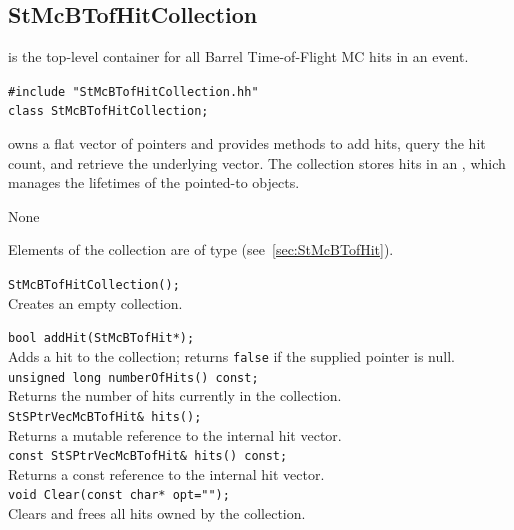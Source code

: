 \subsection{StMcBTofHitCollection}
 
\label{sec:StMcBTofHitCollection}
\begin{Entry}
\item[Summary]
     is the top-level container for all
    Barrel Time-of-Flight MC hits in an event.

\item[Synopsis]
    \verb+#include "StMcBTofHitCollection.hh"+\\
    \verb+class StMcBTofHitCollection;+\\

\item[Description]
     owns a flat vector of
     pointers and provides methods to add hits,
    query the hit count, and retrieve the underlying vector.
    The collection stores hits in an ,
    which manages the lifetimes of the pointed-to objects.

\item[Persistence]
    None

\item[Related Classes]
    Elements of the collection are of type
     (see~\ref{sec:StMcBTofHit}).

\item[Public\\ Constructors]
    \verb+StMcBTofHitCollection();+\\
    Creates an empty collection.

\item[Public Member\\ Functions]
    \verb+bool addHit(StMcBTofHit*);+\\
    Adds a hit to the collection; returns \texttt{false} if the
    supplied pointer is null.\\

    \verb+unsigned long numberOfHits() const;+\\
    Returns the number of hits currently in the collection.\\

    \verb+StSPtrVecMcBTofHit& hits();+\\
    Returns a mutable reference to the internal hit vector.\\

    \verb+const StSPtrVecMcBTofHit& hits() const;+\\
    Returns a const reference to the internal hit vector.\\

    \verb+void Clear(const char* opt="");+\\
    Clears and frees all hits owned by the collection.

\end{Entry}
\clearpage

